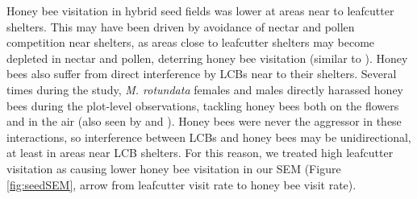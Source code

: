 \documentclass[12pt]{article} %
\begin{document}

Honey bee visitation in hybrid seed fields was lower at areas near to leafcutter shelters. 
This may have been driven by avoidance of nectar and pollen competition near shelters, as areas close to leafcutter shelters may become depleted in nectar and pollen, deterring honey bee visitation (similar to \citealp{currie1997}).
Honey bees also suffer from direct interference by LCBs near to their shelters.
Several times during the study, \textit{M. rotundata} females and males directly harassed honey bees during the plot-level observations, tackling honey bees both on the flowers and in the air (also seen by \citealp{batra1978} and \citealp{waytesMsc}). 
Honey bees were never the aggressor in these interactions, so interference between LCBs and honey bees may be unidirectional, at least in areas near LCB shelters. 
For this reason, we treated high leafcutter visitation as causing lower honey bee visitation in our SEM (Figure \ref{fig:seedSEM}, arrow from leafcutter visit rate to honey bee visit rate).
\end{document}
